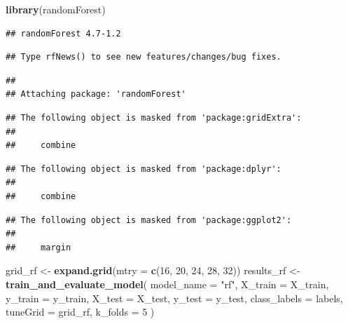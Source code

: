 \documentclass[
]{article}
\newenvironment{Shaded}{\begin{snugshade}}{\end{snugshade}}
\newcommand{\AttributeTok}[1]{\textcolor[rgb]{0.13,0.29,0.53}{#1}}
\newcommand{\DecValTok}[1]{\textcolor[rgb]{0.00,0.00,0.81}{#1}}
\newcommand{\FunctionTok}[1]{\textcolor[rgb]{0.13,0.29,0.53}{\textbf{#1}}}
\newcommand{\NormalTok}[1]{#1}
\newcommand{\OtherTok}[1]{\textcolor[rgb]{0.56,0.35,0.01}{#1}}
\newcommand{\StringTok}[1]{\textcolor[rgb]{0.31,0.60,0.02}{#1}}
\begin{document}
\begin{Shaded}
\begin{Highlighting}[]
\FunctionTok{library}\NormalTok{(randomForest)}
\end{Highlighting}
\end{Shaded}

\begin{verbatim}
## randomForest 4.7-1.2
\end{verbatim}

\begin{verbatim}
## Type rfNews() to see new features/changes/bug fixes.
\end{verbatim}

\begin{verbatim}
## 
## Attaching package: 'randomForest'
\end{verbatim}

\begin{verbatim}
## The following object is masked from 'package:gridExtra':
## 
##     combine
\end{verbatim}

\begin{verbatim}
## The following object is masked from 'package:dplyr':
## 
##     combine
\end{verbatim}

\begin{verbatim}
## The following object is masked from 'package:ggplot2':
## 
##     margin
\end{verbatim}

\begin{Shaded}
\begin{Highlighting}[]
\NormalTok{grid\_rf }\OtherTok{\textless{}{-}} \FunctionTok{expand.grid}\NormalTok{(}\AttributeTok{mtry =} \FunctionTok{c}\NormalTok{(}\DecValTok{16}\NormalTok{, }\DecValTok{20}\NormalTok{, }\DecValTok{24}\NormalTok{, }\DecValTok{28}\NormalTok{, }\DecValTok{32}\NormalTok{))}
\NormalTok{results\_rf }\OtherTok{\textless{}{-}} \FunctionTok{train\_and\_evaluate\_model}\NormalTok{(}
  \AttributeTok{model\_name =} \StringTok{"rf"}\NormalTok{,}
  \AttributeTok{X\_train =}\NormalTok{ X\_train,}
  \AttributeTok{y\_train =}\NormalTok{ y\_train,}
  \AttributeTok{X\_test =}\NormalTok{ X\_test,}
  \AttributeTok{y\_test =}\NormalTok{ y\_test,}
  \AttributeTok{class\_labels =}\NormalTok{ labels,}
  \AttributeTok{tuneGrid =}\NormalTok{ grid\_rf,}
  \AttributeTok{k\_folds =} \DecValTok{5}
\NormalTok{)}
\end{Highlighting}
\end{Shaded}
\end{document}
